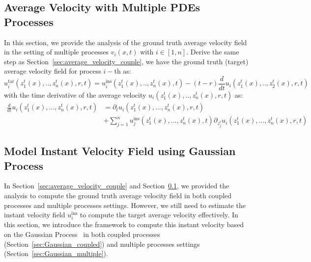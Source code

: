 \documentclass{article}
\begin{document}
\subsection{Average Velocity with Multiple PDEs Processes}
\label{sec:avergae_velocity_multiple}
In this section, we provide the analysis of the ground truth average velocity field in the setting of multiple processes $v_i(x,t)$ with $i \in [1, n]$. Derive the same step as Section~\ref{sec:average_velocity_couple}, we have the ground truth (target) average velocity field for process $i-$th as: 
\begin{equation}
     u_i^{\text{tar}}(z^t_1(x),.., z^t_n(x), r, t) = u^{\text{ins}}_i(z^t_1(x),.., z^t_n(x), t ) - (t -r) \frac{d}{dt}  u_i(z^t_1(x),.., z^t_2(x), r, t) \label{eq:target_def_average_multiple_velocity}
\end{equation}
with the time derivative of the average velocity $u_i(z^t_1(x),.., z^t_n(x), r, t)$ as:
\begin{align}
    \frac{d}{dt}  u_i(z^t_1(x),..., z^t_n(x), r, t) &=\partial_t u_i(z^t_1(x), ...,z^t_n(x), r, t) \label{eq:time_der_multiple} \\ \nonumber
    &+ \sum_{j=1}^{n} u^{\text{ins}}_j( z^t_1(x), ...,z^t_n(x), t ) \partial_{z_j^t} u_i (z^t_1(x),..., z^t_n(x), r, t) 
\end{align}

\subsection{Model Instant Velocity Field using Gaussian Process}
In Section~\ref{sec:average_velocity_couple} and Section~\ref{sec:avergae_velocity_multiple}, we provided the analysis to compute the ground truth average velocity field in both coupled processes and multiple processes settings. However, we still need to estimate the instant velocity field $u^{\text{ins}}_i$ to compute the target average velocity effectively. In this section, we introduce the framework to compute this instant velocity based on the Gaussian Process~\cite{Rasmussen2006Gaussian} in both coupled processes (Section~\ref{sec:Gaussian_coupled}) and multiple processes settings (Section~\ref{sec:Gaussian_multiple}).
\end{document}
